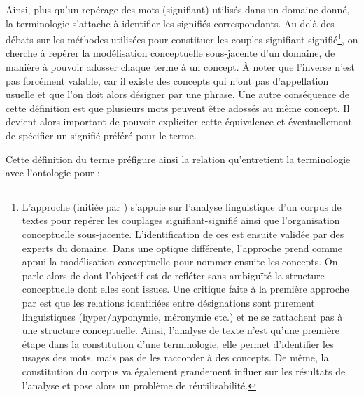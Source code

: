 Ainsi, plus qu'un repérage des mots (signifiant) utilisés dans un domaine donné, la terminologie s'attache à identifier les signifiés correspondants. 
Au-delà des débats sur les méthodes utilisées pour constituer les couples signifiant-signifié\footnote{L'approche  (initiée par \cite{Bourigault1994}) s'appuie sur l'analyse linguistique d'un corpus de textes pour repérer les couplages signifiant-signifié ainsi que l'organisation conceptuelle sous-jacente. L'identification de ces  est ensuite validée par des experts du domaine. 
Dans une optique différente, l'approche  prend comme appui la modélisation conceptuelle pour nommer ensuite les concepts. On parle alors de  dont l'objectif est de refléter sans ambiguïté la structure conceptuelle dont elles sont issues.
Une critique faite à la première approche par \cite{Roche2006} est que les relations identifiées entre désignations sont purement linguistiques (hyper/hyponymie, méronymie etc.) et ne se rattachent pas à une structure conceptuelle. Ainsi, l'analyse de texte n'est qu'une première étape dans la constitution d'une terminologie, elle permet d'identifier les usages des mots, mais pas de les raccorder à des concepts. De même, la constitution du corpus va également grandement influer sur les résultats de l'analyse et pose alors un problème de réutilisabilité.}, on cherche à repérer la modélisation conceptuelle sous-jacente d'un domaine, de manière à pouvoir adosser chaque terme à un concept.
À noter que l'inverse n'est pas forcément valable, car il existe des concepts qui n'ont pas d'appellation usuelle et que l'on doit alors désigner par une phrase. 
Une autre conséquence de cette définition est que plusieurs mots peuvent être adossés au même concept.
Il devient alors important de pouvoir expliciter cette équivalence et éventuellement de spécifier un signifié préféré pour le terme.

Cette définition du terme préfigure ainsi la relation qu'entretient la terminologie avec l'ontologie pour \cite{bachimont:icc} : 


